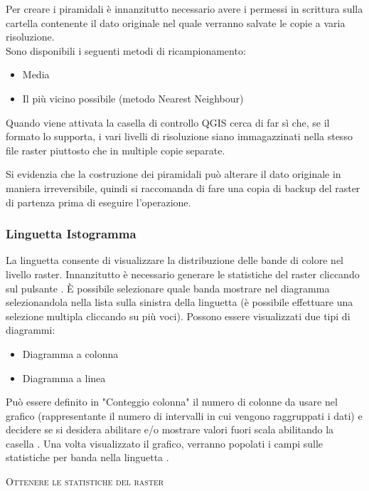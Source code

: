 Per creare i piramidali è innanzitutto necessario avere i permessi in scrittura
sulla cartella contenente il dato originale nel quale verranno salvate le
copie a varia risoluzione. \\
Sono disponibili i seguenti metodi di ricampionamento:
\begin{itemize}
\item Media
\item Il più vicino possibile (metodo Nearest Neighbour)
\end{itemize}

Quando viene attivata la casella di controllo  QGIS cerca di far sì che, se il formato lo supporta, i vari
livelli di risoluzione siano immagazzinati nella stesso file raster piuttosto
che in multiple copie separate.

Si evidenzia che la costruzione dei piramidali può alterare il dato originale
in maniera irreversibile, quindi si raccomanda di fare una copia di backup del
raster di partenza prima di eseguire l'operazione.

\subsubsection{Linguetta Istogramma}\label{label_histogram}

La linguetta  consente di visualizzare la distribuzione
 delle bande di colore nel livello raster.
Innanzitutto è necessario generare le statistiche del raster cliccando sul
pulsante . È possibile selezionare quale banda mostrare nel
diagramma selezionandola nella lista sulla sinistra della linguetta (è
possibile effettuare una selezione multipla cliccando su più voci).
Possono essere visualizzati due tipi di diagrammi: 

\begin{itemize}
\item Diagramma a colonna
\item Diagramma a linea
\end{itemize}

Può essere definito in "Conteggio colonna" il numero di colonne da usare nel grafico
(rappresentante il numero di intervalli in cui vengono raggruppati i dati)
e decidere se si desidera abilitare  e/o
mostrare valori fuori scala abilitando la casella . Una volta visualizzato il grafico, verranno popolati i campi sulle
statistiche per banda nella linguetta .

\begin{Tip}\caption{\textsc{Ottenere le statistiche del raster}}
\end{Tip}

